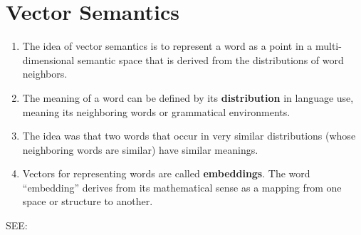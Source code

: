 \section{Vector Semantics \cite{nlp-1}}\label{Vector Semantics}
\begin{enumerate}
    \item The idea of vector semantics is to represent a word as a point in a multi-dimensional semantic space that is derived from the distributions of word neighbors.

    \item The meaning of a word can be defined by its \textbf{distribution} in language use, meaning its neighboring words or grammatical environments. 

    \item The idea was that two words that occur in very similar distributions (whose neighboring words are similar) have similar meanings.

    \item Vectors for representing words are called \textbf{embeddings}. The word “embedding” derives from its mathematical sense as a mapping from one space or structure to another.

\end{enumerate}

SEE: 













































































